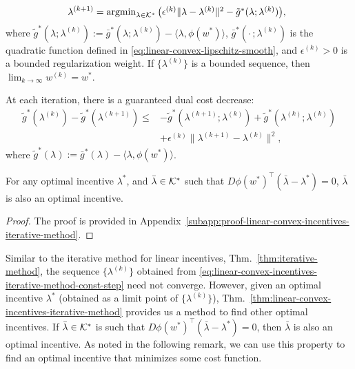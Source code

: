 \begin{theorem}
\begin{subequations}
\begin{flalign}
    & \lambda^{(k+1)} = \textstyle{\argmin}_{\lambda \in \mathset{K}^*} \, \bigl(\epsilon^{(k)} \lVert \lambda - \lambda^{(k)} \rVert^2 -\tilde{g}^*(\lambda; \lambda^{(k)}) \bigr), \hspace{-15pt} && \label{subeq:linear-convex-incentives-iterative-method-const-step-flow}
\end{flalign}
\end{subequations}
where $\tilde{g}^*(\lambda; \lambda^{(k)}) := \bar{g}^*(\lambda; \lambda^{(k)}) - \langle \lambda, \phi(w^*)\rangle$, $\bar{g}^*(\cdot \, ; \lambda^{(k)})$ is the quadratic function defined in \eqref{eq:linear-convex-lipschitz-smooth}, and $\epsilon^{(k)} > 0$ is a bounded regularization weight.
If $\{\lambda^{(k)} \}$ is a bounded sequence, then $\lim_{k \rightarrow \infty} w^{(k)} = w^*$.

At each iteration, there is a guaranteed dual cost decrease:
\begin{align}
\label{eq:linear-convex-incentives-iterative-method-dual-cost-decrease}
     \tilde{g}^*(\lambda^{(k)}) - \tilde{g}^*(\lambda^{(k+1)}) \leq & -\tilde{g}^*(\lambda^{(k+1)}; \lambda^{(k)}) + \tilde{g}^*(\lambda^{(k)}; \lambda^{(k)}) \nonumber \\
    & + \epsilon^{(k)} \lVert \lambda^{(k+1)} - \lambda^{(k)}\rVert^2,
\end{align}
where $\tilde{g}^*(\lambda) := \bar{g}^*(\lambda) - \langle \lambda, \phi(w^*)\rangle$.

For any optimal incentive $\lambda^*$, and $\bar{\lambda} \in \mathcal{K}^*$ such that $D\phi(w^*)^\top (\bar{\lambda} - \lambda^*) = 0$, $\bar{\lambda}$ is also an optimal incentive.
\end{theorem}

\begin{proof}
The proof is provided in Appendix~\ref{subapp:proof-linear-convex-incentives-iterative-method}.
\end{proof}

Similar to the iterative method for linear incentives, Thm.~\ref{thm:iterative-method}, the sequence $\{\lambda^{(k)}\}$ obtained from \eqref{eq:linear-convex-incentives-iterative-method-const-step} need not converge.
However, given an optimal incentive $\lambda^*$ (obtained as a limit point of $\{\lambda^{(k)}\}$), Thm.~\ref{thm:linear-convex-incentives-iterative-method} provides us a method to find other optimal incentives.
If $\bar{\lambda} \in \mathcal{K}^*$ is such that $D\phi(w^*)^\top (\bar{\lambda} - \lambda^*) = 0$, then $\bar{\lambda}$ is also an optimal incentive.
As noted in the following remark, we can use this property to find an optimal incentive that minimizes some cost function.

